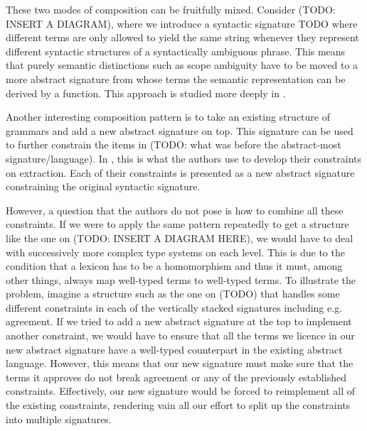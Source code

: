 These two modes of composition can be fruitfully mixed. Consider (TODO:
INSERT A DIAGRAM), where we introduce a syntactic signature TODO where
different terms are only allowed to yield the same string whenever they
represent different syntactic structures of a syntactically ambiguous
phrase. This means that purely semantic distinctions such as scope
ambiguity have to be moved to a more abstract signature from whose terms
the semantic representation can be derived by a function. This approach
is studied more deeply in \cite{pogodalla2007generalizing}.

Another interesting composition pattern is to take an existing structure
of grammars and add a new abstract signature on top. This signature can
be used to further constrain the items in (TODO: what was before the
abstract-most signature/language). In \cite{pogodalla2012controlling},
this is what the authors use to develop their constraints on
extraction. Each of their constraints is presented as a new abstract
signature constraining the original syntactic signature.

However, a question that the authors do not pose is how to combine all
these constraints. If we were to apply the same pattern repeatedly to
get a structure like the one on (TODO: INSERT A DIAGRAM HERE), we would
have to deal with successively more complex type systems on each
level. This is due to the condition that a lexicon has to be a
homomorphism and thus it must, among other things, always map well-typed
terms to well-typed terms. To illustrate the problem, imagine a
structure such as the one on (TODO) that handles some different
constraints in each of the vertically stacked signatures including
e.g. agreement. If we tried to add a new abstract signature at the top
to implement another constraint, we would have to ensure that all the
terms we licence in our new abstract signature have a well-typed
counterpart in the existing abstract language. However, this means that
our new signature must make sure that the terms it approves do not break
agreement or any of the previously established constraints. Effectively,
our new signature would be forced to reimplement all of the existing
constraints, rendering vain all our effort to split up the constraints
into multiple signatures.

